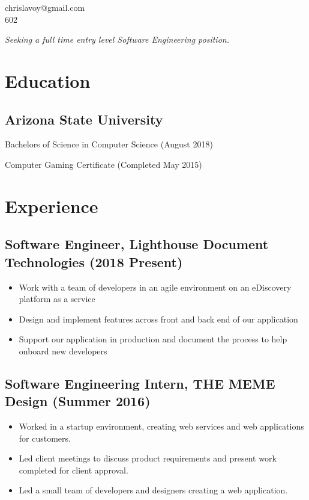 \documentclass[letterpaper, 10pt]{article}
\makeatletter
\renewcommand{\maketitle}
{\begin{center}
{\Large\bfseries\MakeUppercase\theauthor}

chrislavoy@gmail.com\\
602\--999\--2734
\end{center}
}
\makeatother
\begin{document}
\author{Chris LaVoy}

\maketitle

\vspace{-1.5em}
\begin{center}
\em Seeking a full time entry level Software Engineering position.
\end{center}

\vspace{-2em}

\section{Education}

\subsection{Arizona State University}

Bachelors of Science in Computer Science (August 2018)

Computer Gaming Certificate (Completed May 2015)

\vspace{-0.5em}
\section{Experience}

\subsection{Software Engineer, Lighthouse Document Technologies (2018 \- Present)}
\begin{itemize}
\setlength\itemsep{-0.25em}
\item Work with a team of developers in an agile environment on an eDiscovery platform as a service
\item Design and implement features across front and back end of our application
\item Support our application in production and document the process to help onboard new developers
\end{itemize}

\subsection{Software Engineering Intern, THE MEME Design (Summer 2016)}
\begin{itemize}
\setlength\itemsep{-0.25em}
\item Worked in a startup environment, creating web services and web applications for customers.
\item Led client meetings to discuss product requirements and present work completed for client approval.
\item Led a small team of developers and designers creating a web application.
\end{itemize}
\end{document}
